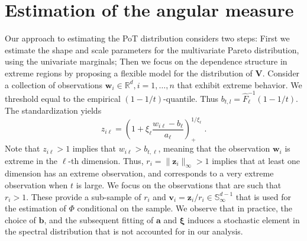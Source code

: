 \section{Estimation of the angular measure\label{sec:methodology}}

Our approach to estimating the PoT distribution considers two steps: First we 
    estimate the shape and scale parameters for the
    multivariate Pareto distribution, using the univariate marginals; Then 
    we focus on the dependence structure in extreme regions by proposing a 
    flexible model for the distribution of $\bm{V}$. Consider a collection of 
    observations  $\bm{w}_i \in {\mathbb R}^d, i = 1, \ldots, n$ that exhibit 
    extreme behavior.  We  threshold equal to the empirical $(1-1/t)$-quantile. 
    Thus $b_{t,l}  = \hat{F}^{-1}_{\ell}(1 - 1/t)$.  The   standardization  yields
    \begin{equation}
            \label{eqn:standardization}
            z_{i\ell} = \left(1 + \xi_{\ell}\frac{w_{i\ell} -
                b_{\ell}}{a_{\ell}}\right)_{+}^{1/\xi_{\ell}}\; .
        \end{equation}
    Note that $z_{i\ell}> 1$ implies that $w_{i\ell} > b_{t,\ell}$, meaning 
    that the observation $\bm{w}_i$ is extreme in the $\ell$-th dimension. 
    Thus, $r_i = \|\bm{z}_i\|_\infty > 1$ implies that at
    least one dimension has an extreme observation, and corresponds 
    to a very extreme observation when $t$ is large. We focus on 
    the observations that are such that $r_i > 1$. These provide a
    sub-sample of $r_i$ and $\bm{v}_i = \bm{z}_i /r_i \in 
    \mathbb{S}_{\infty}^{d-1}$ that is used for  the estimation of 
    $\Phi$ conditional on the sample. We observe that in practice, the choice
    of $\bm{b}$, and the subsequent fitting of $\bm{a}$ and $\bm{\xi}$ induces
    a stochastic element in the spectral distribution that is not accounted for
    in our analysis.  



